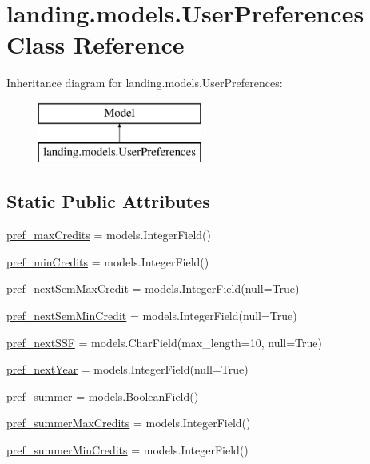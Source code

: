 \hypertarget{classlanding_1_1models_1_1UserPreferences}{}\section{landing.\+models.\+User\+Preferences Class Reference}
\label{classlanding_1_1models_1_1UserPreferences}
Inheritance diagram for landing.\+models.\+User\+Preferences\+:\begin{figure}[H]
\begin{center}
\leavevmode
\includegraphics[height=2.000000cm]{classlanding_1_1models_1_1UserPreferences}
\end{center}
\end{figure}
\subsection*{Static Public Attributes}
\begin{DoxyCompactItemize}
\item 
\mbox{\hyperlink{classlanding_1_1models_1_1UserPreferences_a01a3066ef3e14f95e7749494de25e698}{pref\+\_\+max\+Credits}} = models.\+Integer\+Field()
\item 
\mbox{\hyperlink{classlanding_1_1models_1_1UserPreferences_a7f5982f807cfd77d3e54369e807cbbbf}{pref\+\_\+min\+Credits}} = models.\+Integer\+Field()
\item 
\mbox{\hyperlink{classlanding_1_1models_1_1UserPreferences_a8ff382133c91bf0c8775c98d6167e570}{pref\+\_\+next\+Sem\+Max\+Credit}} = models.\+Integer\+Field(null=True)
\item 
\mbox{\hyperlink{classlanding_1_1models_1_1UserPreferences_a29c59f4202078df42d2b36004ddd42ef}{pref\+\_\+next\+Sem\+Min\+Credit}} = models.\+Integer\+Field(null=True)
\item 
\mbox{\hyperlink{classlanding_1_1models_1_1UserPreferences_a1bca302f110047fa3c4ddb92a72e93b1}{pref\+\_\+next\+S\+SF}} = models.\+Char\+Field(max\+\_\+length=10, null=True)
\item 
\mbox{\hyperlink{classlanding_1_1models_1_1UserPreferences_a5ca4985a674bd12b3e1749779ecc7024}{pref\+\_\+next\+Year}} = models.\+Integer\+Field(null=True)
\item 
\mbox{\hyperlink{classlanding_1_1models_1_1UserPreferences_a4aaacfc3aa258135e00af12c6ec4d09f}{pref\+\_\+summer}} = models.\+Boolean\+Field()
\item 
\mbox{\hyperlink{classlanding_1_1models_1_1UserPreferences_aa092d2329abff89f22e57a07959ddad5}{pref\+\_\+summer\+Max\+Credits}} = models.\+Integer\+Field()
\item 
\mbox{\hyperlink{classlanding_1_1models_1_1UserPreferences_a48d4f7a3be77d9bbc0b1a40cf8e993ce}{pref\+\_\+summer\+Min\+Credits}} = models.\+Integer\+Field()
\end{DoxyCompactItemize}


